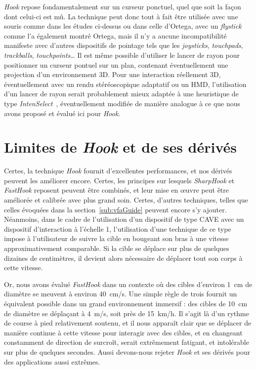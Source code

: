 	\emph{Hook} repose fondamentalement sur un curseur ponctuel, quel que soit la façon dont celui-ci est mû. La technique peut donc tout à fait être utilisée avec une souris comme dans les études ci-dessus ou dans celle d'Ortega, avec un \emph{flystick} comme l'a également montré Ortega, mais il n'y a aucune incompatibilité manifeste avec d'autres dispositifs de pointage tels que les \emph{joysticks}, \emph{touchpads}, \emph{trackballs}, \emph{touchpoints}\ldots{} Il est même possible d'utiliser le lancer de rayon pour positionner un curseur pontuel sur un plan, contenant éventuellement une projection d'un environnement 3D. Pour une interaction réellement 3D, éventuellement avec un rendu stéréoscopique adaptatif ou un HMD, l'utilisation d'un lancer de rayon serait probablement mieux adaptée à une heuristique de type \emph{IntenSelect}~\cite{de2005intenselect}, éventuellement modifiée de manière analogue à ce que nous avons proposé et évalué ici pour \emph{Hook}.
	
		
\section{Limites de \emph{Hook} et de ses dérivés}
	Certes, la technique \emph{Hook} fournit d'excellentes performances, et nos dérivés peuvent les améliorer encore. Certes, les principes sur lesquels \emph{SharpHook} et \emph{FastHook} reposent peuvent être combinés, et leur mise en œuvre peut être améliorée et calibrée avec plus grand soin. Certes, d'autres techniques, telles que celles évoquées dans la section~\ref{sub:vfaGuide} peuvent encore s'y ajouter. Néanmoins, dans le cadre de l'utilisation d'un dispositif de type CAVE avec un dispositif d'interaction à l'échelle 1, l'utilisation d'une technique de ce type impose à l'utilisateur de suivre la cible en bougeant son bras à une vitesse approximativement comparable. Si la cible se déplace sur plus de quelques dizaines de centimètres, il devient alors nécessaire de déplacer tout son corps à cette vitesse.
	
	Or, nous avons évalué \emph{FastHook} dans un contexte où des cibles d'environ 1~cm de diamètre se meuvent à environ 40~cm/s. Une simple règle de trois fournit un équivalent possible dans un grand environnement immersif : des cibles de 10~cm de diamètre se déplaçant à 4~m/s, soit près de 15~km/h. Il s'agit là d'un rythme de course à pied relativement soutenu, et il nous apparaît clair que se déplacer de manière continue à cette vitesse pour interagir avec des cibles, et en changeant constamment de direction de surcroît, serait extrêmement fatigant, et intolérable sur plus de quelques secondes. Aussi devons-nous rejeter \emph{Hook} et ses dérivés pour des applications aussi extrêmes.
	
